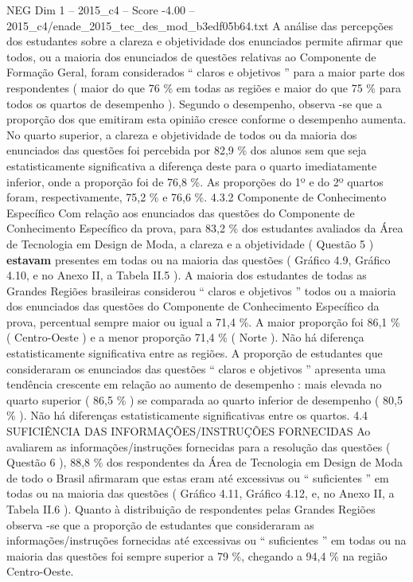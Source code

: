 \begin{textsample}{NEG Dim 1 – 2015\_c4 – Score -4.00 – 2015\_c4/enade\_2015\_tec\_des\_mod\_b3edf05b64.txt}
A análise das percepções dos estudantes sobre a clareza e objetividade dos enunciados permite afirmar que todos, ou a maioria dos enunciados de questões relativas ao Componente de Formação Geral, foram considerados “ claros e objetivos ” para a maior parte dos respondentes ( maior do que 76 \% em todas as regiões e maior do que 75 \% para todos os quartos de desempenho ).
Segundo o desempenho, observa -se que a proporção dos que emitiram esta opinião cresce conforme o desempenho aumenta.
No quarto superior, a clareza e objetividade de todos ou da maioria dos enunciados das questões foi percebida por 82,9 \% dos alunos sem que seja estatisticamente significativa a diferença deste para o quarto imediatamente inferior, onde a proporção foi de 76,8 \%.
As proporções do 1º e do 2º quartos foram, respectivamente, 75,2 \% e 76,6 \%. 4.3.2 Componente de Conhecimento Específico Com relação aos enunciados das questões do Componente de Conhecimento Específico da prova, para 83,2 \% dos estudantes avaliados da Área de Tecnologia em Design de Moda, a clareza e a objetividade ( Questão 5 ) \textbf{estavam} presentes em todas ou na maioria das questões ( Gráfico 4.9, Gráfico 4.10, e no Anexo II, a Tabela II.5 ).
A maioria dos estudantes de todas as Grandes Regiões brasileiras considerou “ claros e objetivos ” todos ou a maioria dos enunciados das questões do Componente de Conhecimento Específico da prova, percentual sempre maior ou igual a 71,4 \%.
A maior proporção foi 86,1 \% ( Centro-Oeste ) e a menor proporção 71,4 \% ( Norte ).
Não há diferença estatisticamente significativa entre as regiões.
A proporção de estudantes que consideraram os enunciados das questões “ claros e objetivos ” apresenta uma tendência crescente em relação ao aumento de desempenho : mais elevada no quarto superior ( 86,5 \% ) se comparada ao quarto inferior de desempenho ( 80,5 \% ).
Não há diferenças estatisticamente significativas entre os quartos. 4.4 SUFICIÊNCIA DAS INFORMAÇÕES/INSTRUÇÕES FORNECIDAS Ao avaliarem as informações/instruções fornecidas para a resolução das questões ( Questão 6 ), 88,8 \% dos respondentes da Área de Tecnologia em Design de Moda de todo o Brasil afirmaram que estas eram até excessivas ou “ suficientes ” em todas ou na maioria das questões ( Gráfico 4.11, Gráfico 4.12, e, no Anexo II, a Tabela II.6 ).
Quanto à distribuição de respondentes pelas Grandes Regiões observa -se que a proporção de estudantes que consideraram as informações/instruções fornecidas até excessivas ou “ suficientes ” em todas ou na maioria das questões foi sempre superior a 79 \%, chegando a 94,4 \% na região Centro-Oeste.

\end{textsample}
